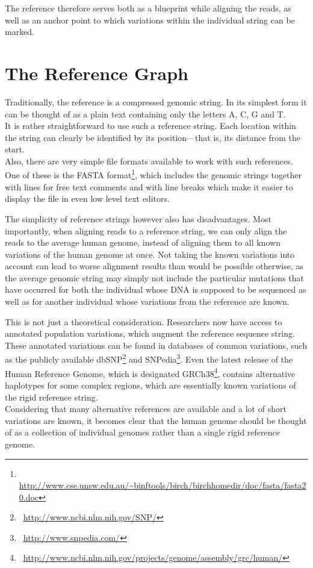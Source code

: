 \documentclass[a4paper,12pt,twoside,BCOR=10mm]{scrbook}
\begin{document}
The reference therefore serves both as a blueprint while aligning the reads,
as well as an anchor point to which variations within the individual string can be marked.

\section{The Reference Graph}

Traditionally, the reference is a compressed genomic string.
In its simplest form it can be thought of as a plain text containing only the letters
A, C, G and T. \\
It is rather straightforward to use such a reference string.
Each location within the string can clearly be identified by its position---that is,
its distance from the start. \\
Also, there are very simple file formats available to work with
such references. One of these is the
FASTA format\footnote{\,\,\,\url{http://www.cse.unsw.edu.au/~binftools/birch/birchhomedir/doc/fasta/fasta20.doc}},
which includes the genomic
strings together with lines for free text comments and with line breaks which
make it easier to display the file in even low level text editors.

The simplicity of reference strings however also has disadvantages.
Most importantly, when aligning reads to a reference string, we can only align
the reads to the average human genome, instead of aligning them to all known
variations of the human genome at once.
Not taking the known variations into account can lead to worse alignment results
than would be possible otherwise, as the average genomic string may simply not
include the particular mutations that have occurred for both the individual
whose DNA is supposed to be sequenced as well as for another individual whose
variations from the reference are known.

This is not just a theoretical consideration.
Researchers now have access to annotated population variations, which augment the reference sequence string.
These annotated variations can be found in databases of common variations, such as the publicly available
dbSNP\footnote{\,\,\,\url{http://www.ncbi.nlm.nih.gov/SNP/}}
and SNPedia\footnote{\,\,\,\url{http://www.snpedia.com/}}.
Even the latest release of the Human Reference Genome,
which is designated
GRCh38\footnote{\,\,\,\url{http://www.ncbi.nlm.nih.gov/projects/genome/assembly/grc/human/}},
contains alternative haplotypes for some complex regions,
which are essentially known variations of the rigid reference string. \\
Considering that many alternative references are available and a lot of short variations are known,
it becomes clear that the human genome should be thought of as a collection of individual genomes
rather than a single rigid reference genome.
\end{document}
